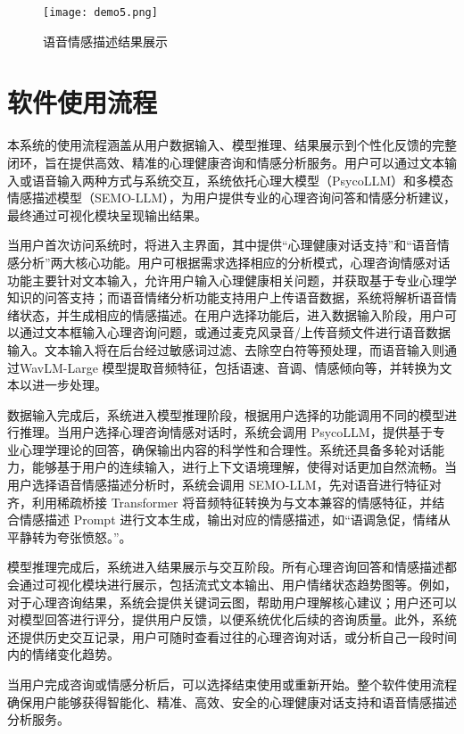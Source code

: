 \begin{figure}[ht]
  \centering
  \texttt{[image: demo5.png]}
  \caption{语音情感描述结果展示}
  \label{fig:语音情感描述结果展示}
\end{figure}

\section{软件使用流程}

本系统的使用流程涵盖从用户数据输入、模型推理、结果展示到个性化反馈的完整闭环，旨在提供高效、精准的心理健康咨询和情感分析服务。用户可以通过文本输入或语音输入两种方式与系统交互，系统依托心理大模型（PsycoLLM）和多模态情感描述模型（SEMO-LLM），为用户提供专业的心理咨询问答和情感分析建议，最终通过可视化模块呈现输出结果。

当用户首次访问系统时，将进入主界面，其中提供“心理健康对话支持”和“语音情感分析”两大核心功能。用户可根据需求选择相应的分析模式，心理咨询情感对话功能主要针对文本输入，允许用户输入心理健康相关问题，并获取基于专业心理学知识的问答支持；而语音情绪分析功能支持用户上传语音数据，系统将解析语音情绪状态，并生成相应的情感描述。在用户选择功能后，进入数据输入阶段，用户可以通过文本框输入心理咨询问题，或通过麦克风录音/上传音频文件进行语音数据输入。文本输入将在后台经过敏感词过滤、去除空白符等预处理，而语音输入则通过WavLM-Large 模型提取音频特征，包括语速、音调、情感倾向等，并转换为文本以进一步处理。

数据输入完成后，系统进入模型推理阶段，根据用户选择的功能调用不同的模型进行推理。当用户选择心理咨询情感对话时，系统会调用 PsycoLLM，提供基于专业心理学理论的回答，确保输出内容的科学性和合理性。系统还具备多轮对话能力，能够基于用户的连续输入，进行上下文语境理解，使得对话更加自然流畅。当用户选择语音情感描述分析时，系统会调用 SEMO-LLM，先对语音进行特征对齐，利用稀疏桥接 Transformer 将音频特征转换为与文本兼容的情感特征，并结合情感描述 Prompt 进行文本生成，输出对应的情感描述，如“语调急促，情绪从平静转为夸张愤怒。”。

模型推理完成后，系统进入结果展示与交互阶段。所有心理咨询回答和情感描述都会通过可视化模块进行展示，包括流式文本输出、用户情绪状态趋势图等。例如，对于心理咨询结果，系统会提供关键词云图，帮助用户理解核心建议；用户还可以对模型回答进行评分，提供用户反馈，以便系统优化后续的咨询质量。此外，系统还提供历史交互记录，用户可随时查看过往的心理咨询对话，或分析自己一段时间内的情绪变化趋势。

当用户完成咨询或情感分析后，可以选择结束使用或重新开始。整个软件使用流程确保用户能够获得智能化、精准、高效、安全的心理健康对话支持和语音情感描述分析服务。

